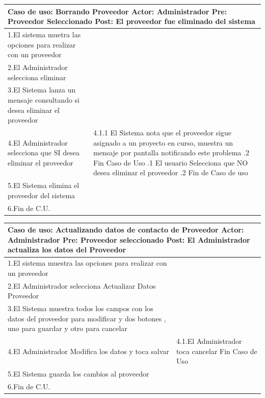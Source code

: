 \begin{longtable}{| p{} | p{} |}
    \hline
    \multicolumn{2}{|p{16cm}|}{
        \textbf{Caso de uso:} Borrando Proveedor \newline
        \textbf{Actor:} Administrador\newline
        \textbf{Pre:}  Proveedor Seleccionado\newline
        \textbf{Post:} El proveedor fue eliminado del sistema
    }\\
    \hline
    1.El sistema  muetra las opciones para realizar con un proveedor & \\
    \hline
    2.El Administrador selecciona eliminar& \\
    \hline
    3.El Sistema lanza un mensaje consultando si desea eliminar el proveedor &  \\
    \hline
    4.El Administrador selecciona que SI desea eliminar el proveedor & 4.1.1 El Sistema nota que el proveedor sigue asignado a un proyecto en curso, muestra un mensaje por pantalla notificando este problema \newline 4.1.2 Fin Caso de Uso \newline 4.2.1 El usuario Selecciona que NO desea eliminar el proveedor \newline4.2.2 Fin de Caso de uso\\
    \hline
    5.El Sistema elimina el proveedor del sistema &  \\
    \hline
    6.Fin de C.U.& \\
    \hline
\end{longtable}
\begin{longtable}{|p{}|p{}|}
    \hline
    \multicolumn{2}{|p{16cm}|}{
        \textbf{Caso de uso:} Actualizando datos de contacto de Proveedor \newline
        \textbf{Actor:} Administrador\newline
        \textbf{Pre:}  Proveedor seleccionado\newline
        \textbf{Post:} El Administrador actualiza los datos del Proveedor
    }\\
    \hline
    1.El sistema  muestra las opciones para realizar con un proveedor & \\
    \hline
    2.El Administrador selecciona Actualizar Datos Proveedor&   \\
    \hline
    3.El Sistema muestra todos los campos con los datos del proveedor para modificar y dos botones , uno para guardar y otro para cancelar&  \\
    \hline
    4.El Administrador Modifica los datos y toca salvar & 4.1.El Administrador toca cancelar \newline 4.2 Fin Caso de Uso \\
    \hline
    5.El Sistema guarda los cambios al proveedor &  \\
    \hline
    6.Fin de C.U.& \\
    \hline
\end{longtable}

